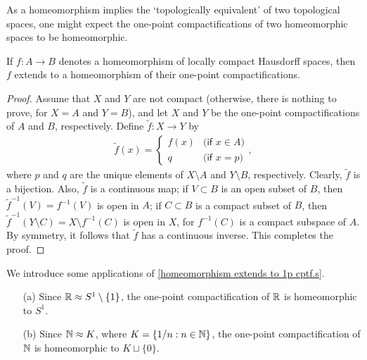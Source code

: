 As a homeomorphism implies the `topologically equivalent' of two topological spaces, one might expect the one-point compactifications of two homeomorphic spaces to be homeomorphic.
\begin{thm}\label{homeomorphism extends to 1p cptf.s}
    If $f: A\rightarrow B$ denotes a homeomorphism of locally compact Hausdorff spaces, then $f$ extends to a homeomorphism of their one-point compactifications.
\end{thm}
\begin{proof}
    Assume that $X$ and $Y$ are not compact (otherwise, there is nothing to prove, for $X=A$ and $Y=B$), and let $X$ and $Y$ be the one-point compactifications of $A$ and $B$, respectively.
    Define $\widetilde{f}: X\rightarrow Y$ by
    \begin{align*}
        \widetilde{f}(x)=\left\{\begin{array}{cc}
            f(x)    &   \textsf{(if $x\in A$)}\\
            q       &   \textsf{(if $x=p$)}
        \end{array}\right.,
    \end{align*}
    where $p$ and $q$ are the unique elements of $X\setminus A$ and $Y\setminus B$, respectively.
    Clearly, $\widetilde{f}$ is a bijection.
    Also, $\widetilde{f}$ is a continuous map; if $V\subset B$ is an open subset of $B$, then $\widetilde{f}^{-1}(V)=f^{-1}(V)$ is open in $A$; if $C\subset B$ is a compact subset of $B$, then $\widetilde{f}^{-1}(Y\setminus C)=X\setminus f^{-1}(C)$ is open in $X$, for $f^{-1}(C)$ is a compact subspace of $A$.
    By symmetry, it follows that $\widetilde{f}$ has a continuous inverse.
    This completes the proof.
\end{proof}
\begin{exmp}
    We introduce some applications of \cref{homeomorphism extends to 1p cptf.s}.
    \begin{enumerate}
        \item[(a)]
        {
            Since ${\mathbb{R}}\approx S^1\setminus\{1\}$, the one-point compactification of ${\mathbb{R}}$ is homeomorphic to $S^1$.
        }
        \item[(b)]
        {
            Since ${\mathbb{N}}\approx K$, where $K=\left\{1/n: n\in{\mathbb{N}}\right\}$, the one-point compactification of ${\mathbb{N}}$ is homeomorphic to $K\sqcup\{0\}$.
        }
    \end{enumerate}
\end{exmp}